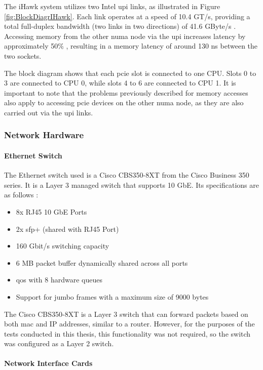 The iHawk system utilizes two Intel \ac{upi} links, as illustrated in Figure \ref{fig:BlockDiagrIHawk}. Each link operates at a speed of 10.4 GT/s, providing a total full-duplex bandwidth (two links in two directions) of 41.6 GByte/s \cite{setup08}. Accessing memory from the other \ac{numa} node via the \ac{upi} increases latency by approximately 50\% \cite{setup06}, resulting in a memory latency of around 130 ns \cite{setup07} between the two sockets.

The block diagram shows that each \ac{pcie} slot is connected to one \ac{CPU}. Slots 0 to 3 are connected to \ac{CPU} 0, while slots 4 to 6 are connected to \ac{CPU} 1. It is important to note that the problems previously described for memory accesses also apply to accessing \ac{pcie} devices on the other \ac{numa} node, as they are also carried out via the \ac{upi} links.


\subsubsection{Network Hardware}

\paragraph{Ethernet Switch} \label{chap:EthernetSwitch}
The Ethernet switch used is a Cisco CBS350-8XT from the Cisco Business 350 series. It is a Layer 3 managed switch that supports 10 GbE. Its specifications are as follows \cite{setup09}:

\begin{itemize}
\item 8x RJ45 10 GbE Ports
\item 2x \ac{sfp}+ (shared with RJ45 Port)
\item 160 Gbit/s switching capacity
\item 6 MB packet buffer dynamically shared across all ports
\item \acf{qos} with 8 hardware queues
\item Support for jumbo frames with a maximum size of 9000 bytes
\end{itemize}

The Cisco CBS350-8XT is a Layer 3 switch that can forward packets based on both \ac{mac} and IP addresses, similar to a router.  However, for the purposes of the tests conducted in this thesis, this functionality was not required, so the switch was configured as a Layer 2 switch.

\paragraph{Network Interface Cards} \label{chap:NicTypes}

